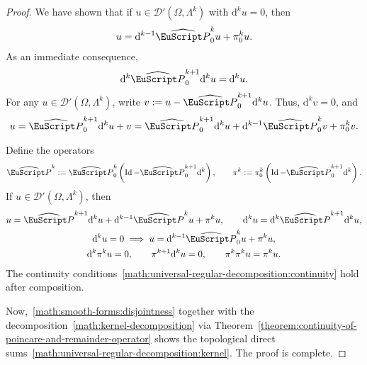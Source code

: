 \documentclass[10pt,a4paper]{amsart}
\theoremstyle{definition}
\theoremstyle{remark}
\numberwithin{equation}{section}
\newcommand{\calD}{{\mathcal D}}
\newcommand{\euP}{{\EuScript P}}
\newcommand{\Id}{\operatorname{Id}}
\newcommand{\cartan}{{\mathrm d}}
\newcommand{\Domain}{{\Omega}}
\newcommand{\Alt}[1]{\Lambda^{#1}}
\newcommand{\Proj}{\pi}
\newcommand{\Poincare}{\euP}
\begin{document}
\begin{proof}
    We have shown that if $u \in \calD'(\Domain,\Alt{k})$ with $\cartan^{k} u = 0$, then 
    \begin{align}\label{math:kernel-decomposition}
        u = \cartan^{k-1} \widehat\Poincare^{k}_{0} u + \Proj_{0}^{k} u
        .
    \end{align}
    As an immediate consequence, 
    \begin{align*}
        \cartan^{k} \widehat\Poincare^{k+1}_{0} \cartan^{k} u = \cartan^{k} u.
    \end{align*}
    For any $u \in \calD'(\Domain,\Alt{k})$, write $v := u - \widehat\Poincare^{k+1}_{0} \cartan^{k} u$. Thus, $\cartan^{k} v = 0$, and 
    \begin{align*}
        u 
        = 
        \widehat\Poincare^{k+1}_{0} \cartan^{k} u + v
        = 
        \widehat\Poincare^{k+1}_{0} \cartan^{k} u + \cartan^{k-1} \widehat\Poincare^{k}_{0} v + \Proj_{0}^{k} v
        .
    \end{align*}
    
    
    Define the operators 
    \begin{align*}
        \widehat\Poincare^{k} := \widehat\Poincare^{k}_{0} \left( \Id - \widehat\Poincare^{k+1}_{0} \cartan^{k} \right),
        \qquad 
        \Proj^{k} := \Proj^{k}_{0} \left( \Id - \widehat\Poincare^{k+1}_{0} \cartan^{k} \right)
        .
    \end{align*}
    If $u \in \calD'(\Domain,\Alt{k})$, then 
    \begin{gather*}
        u 
        = 
        \widehat\Poincare^{k+1} \cartan^{k} u + \cartan^{k-1} \widehat\Poincare^{k} u + \Proj^{k} u
        ,
        \qquad 
        \cartan^{k} u 
        = 
        \cartan^{k} \widehat\Poincare^{k+1} \cartan^{k} u
        ,
        \\
        \cartan^{k} u = 0 \implies u = \cartan^{k-1} \widehat\Poincare^{k}_{0} u + \Proj^{k} u,
        \\
        \cartan^{k} \Proj^{k} u = 0, \qquad \Proj^{k+1} \cartan^{k} u = 0, \qquad \Proj^{k} \Proj^{k} u = \Proj^{k} u
        .
    \end{gather*}
    The continuity conditions~\eqref{math:universal-regular-decomposition:continuity} hold after composition.

Now,~\eqref{math:smooth-forms:disjointness} together with the decomposition~\eqref{math:kernel-decomposition}
    via Theorem~\ref{theorem:continuity-of-poincare-and-remainder-operator} 
    shows the topological direct sums~\eqref{math:universal-regular-decomposition:kernel}. 
    The proof is complete. 
\end{proof}
\end{document}

